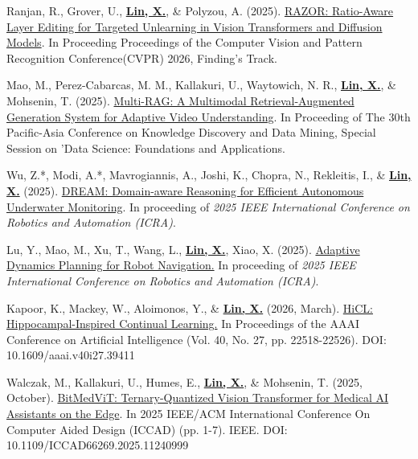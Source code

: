 \documentclass[a4paper,11pt]{article}
\begin{document}
\item[\textbf{[C.13]}] Ranjan, R., Grover, U., \textbf{\underline{Lin, X.}}, \& Polyzou, A. (2025). \href{https://arxiv.org/pdf/2603.14819}{RAZOR: Ratio-Aware Layer Editing for Targeted Unlearning in Vision
Transformers and Diffusion Models}. In Proceeding Proceedings of the Computer Vision and Pattern Recognition Conference(CVPR) 2026, Finding's Track.

\item[\textbf{[C.12]}] Mao, M., Perez-Cabarcas, M. M., Kallakuri, U., Waytowich, N. R., \textbf{\underline{Lin, X.}}, \& Mohsenin, T. (2025). \href{https://arxiv.org/abs/2505.23990}{Multi-RAG: A Multimodal Retrieval-Augmented Generation System for Adaptive Video Understanding}. In Proceeding of The 30th Pacific-Asia Conference on Knowledge Discovery and Data Mining, Special Session on 'Data Science: Foundations and Applications.

\item[\textbf{[C.11]}] Wu, Z.*, Modi, A.*, Mavrogiannis, A., Joshi, K., Chopra, N., Rekleitis, I., \& \textbf{\underline{Lin, X.}} (2025). \href{https://arxiv.org/pdf/2509.13666?}{DREAM: Domain-aware Reasoning for Efficient Autonomous Underwater Monitoring}. In proceeding of \textit{2025 IEEE International Conference on Robotics and Automation (ICRA)}.

\item[\textbf{[C.10]}] Lu, Y., Mao, M., Xu, T., Wang, L., \textbf{\underline{Lin, X.}}, Xiao, X. (2025). \href{https://arxiv.org/pdf/2510.05330}{Adaptive Dynamics Planning for Robot Navigation.} In proceeding of \textit{2025 IEEE International Conference on Robotics and Automation (ICRA)}.

\item[\textbf{[C.9]}]Kapoor, K., Mackey, W., Aloimonos, Y., \& \textbf{\underline{Lin, X.}} (2026, March). \href{https://ojs.aaai.org/index.php/AAAI/article/view/39411/43372}{HiCL: Hippocampal-Inspired Continual Learning.} In Proceedings of the AAAI Conference on Artificial Intelligence (Vol. 40, No. 27, pp. 22518-22526). DOI: 10.1609/aaai.v40i27.39411


\item[\textbf{[C.8]}]Walczak, M., Kallakuri, U., Humes, E., \textbf{\underline{Lin, X.}}, \& Mohsenin, T. (2025, October). \href{https://ieeexplore.ieee.org/abstract/document/11240999}{BitMedViT: Ternary-Quantized Vision Transformer for Medical AI Assistants on the Edge}. In 2025 IEEE/ACM International Conference On Computer Aided Design (ICCAD) (pp. 1-7). IEEE. DOI: 10.1109/ICCAD66269.2025.11240999
\end{document}
